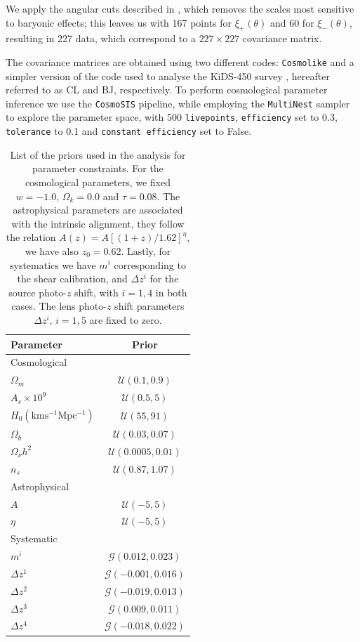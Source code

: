 \documentclass[twocolumn]{\docclass}
\begin{document}
	We apply the angular cuts described in \citep{Abbott:2018cms}, which removes the scales most sensitive to baryonic effects; this leaves us with 167 points for $\xi_+(\theta)$ and 60 for $\xi_-(\theta)$, resulting in 227 data, which correspond to a $227 \times 227$ covariance matrix.
	
	The covariance matrices are obtained using two different codes: {\tt Cosmolike} \citep{Krause:2016jvl} and a simpler version of the code used to analyse the KiDS-450 survey \citep{Kohlinger:2017sxk}, hereafter referred to as CL and BJ, respectively. To perform cosmological parameter inference we use the {\tt CosmoSIS} \citep{Zuntz:2015med} pipeline, while employing the {\tt MultiNest} \citep{Feroz:2009fhb} sampler to explore the parameter space, with 500 {\tt livepoints}, {\tt efficiency} set to 0.3, {\tt tolerance} to 0.1 and {\tt constant efficiency} set to False.
	
	\begin{table}
		\centering
		\begin{tabular} { l c} 
			\hline
			\hline
			Parameter							& Prior	\\ \hline
			Cosmological & \\ [1ex]
			$\Omega_m$						& $\mathcal{U}(0.1, 0.9)$		\\
			$A_s \times 10^9$					& $\mathcal{U}(0.5, 5)$		\\
			$H_0 \mathrm{(km s^{-1} Mpc^{-1})}$	& $\mathcal{U}(55, 91)$		\\
			$\Omega_b$						& $\mathcal{U}(0.03, 0.07)$	\\
			$\Omega_\nu h^2$					& $\mathcal{U}(0.0005, 0.01)$	\\
			$n_s$							& $\mathcal{U}(0.87, 1.07)$	\\ [1ex]
			\hline
			Astrophysical & \\ [1ex]
			$A$								& $\mathcal{U}(-5, 5)$ \\
			$\eta$							& $\mathcal{U}(-5, 5)$ \\ [1ex]
			\hline
			Systematic & \\ [1ex]
			$m^i$							& $\mathcal{G}(0.012, 0.023)$	 \\
			$\Delta z^1$						& $\mathcal{G}(-0.001, 0.016)$	 \\
			$\Delta z^2$						& $\mathcal{G}(-0.019, 0.013)$	 \\
			$\Delta z^3$						& $\mathcal{G}(0.009, 0.011)$	 \\
			$\Delta z^4$						& $\mathcal{G}(-0.018, 0.022)$	 \\ [1ex]
			\hline
			\hline
		\end{tabular}
		\caption{List of the priors used in the analysis for parameter constraints. For the cosmological parameters, we fixed $w = -1.0$, $\Omega_k =  0.0$ and $\tau =  0.08$. The astrophysical parameters are associated with the intrinsic alignment, they follow the relation $A(z) = A[(1+z)/1.62]^{\eta}$, we have also $z_0 = 0.62$. Lastly, for systematics we have $m^i$ corresponding to the shear calibration, and  $\Delta z^i$ for the source photo-$z$ shift, with $i = 1, 4$ in both cases. The lens photo-$z$ shift parameters $\Delta z^i$, $i = 1, 5$ are fixed to zero.}
		\label{tab:constraints}
	\end{table}
	
\end{document}
